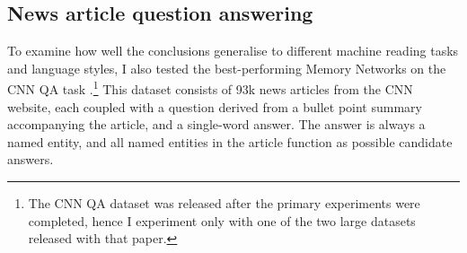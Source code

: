 \fi
	




\begin{table}[ht]
  \begin{center}
   \label{tab:qacnn_res}
    \resizebox{1\linewidth}{!}{
      {\sc 
        \begin{tabular}{l|cc}
          Methods & Validation & Test \\
          \hline
          \hline
          Maximum frequency (article)$^{(*)}$ & 0.305 & 0.332 \\
          Sliding window & 0.005 & 0.006 \\
          Word distance model$^{(*)}$ & 0.505 & 0.509 \\
          \hline 
          Deep LSTMs (article+query)$^{(*)}$ & 0.550 & 0.570 \\
          Contextual LSTMs (``Attentive reader'')$^{(*)}$ & 0.616 & 0.630 \\
          Contextual LSTMs (``Impatient reader'')$^{(*)}$ & 0.618 & 0.638 \\
          \hline
          MemNNs (window memory) & 0.580 & 0.606 \\
          MemNNs (window memory + self-sup.) & 0.634 & 0.668 \\
          \hline
          MemNNs (window memory + ensemble) & 0.612 & 0.638 \\ 
          MemNNs (window memory + self-sup.  + ensemble) & 0.649 & 0.684 \\
          \hline
          MemNNs (window  + self-sup.  +  ensemble + exclud. coocurrences) & \bf 0.662 & \bf 0.694 \\
          \hline
        \end{tabular}
      }
    }
    \caption{\label{tab:qacnn_res} {\bf Results on CNN QA.} $^{(*)}$Results taken from \cite{nips15_hermann}.}\label{cnn}
  \end{center}
  \vspace*{-2ex}
\end{table}


\subsection{News article question answering}
\label{dmind}
To examine how well the conclusions generalise to different machine
reading tasks and language styles, I also tested the
best-performing Memory Networks on the CNN QA task \citep{nips15_hermann}.\footnote{The CNN QA dataset was released after the primary experiments were completed, hence I experiment only with one of the two large datasets released with that paper.} This dataset consists of 93k news articles from the CNN website, each coupled with a question derived from a bullet point summary accompanying the article, and a single-word answer. The answer is always a named entity, and all named entities in the article function as possible candidate answers.

